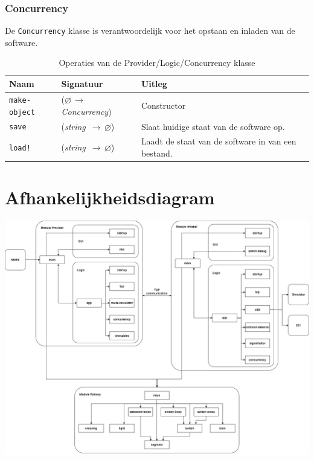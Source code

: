 \documentclass[a4paper, 11pt]{article}
\newcommand{\naar}{\,$\rightarrow$\,}
\renewcommand{\empty}{$\varnothing$}
\newcommand{\<}{\scriptsize\textless\normalsize}
\renewcommand{\>}{\scriptsize\textgreater\normalsize}
\begin{document}
\subsubsection{Concurrency} %
De \texttt{Concurrency} klasse is verantwoordelijk voor het opstaan en inladen van de software.
\begin{table}[H]
	\begin{center}
		\begin{tabular}{|l l l|}
			\hline
			\textbf{Naam} & \textbf{Signatuur} & \textbf{Uitleg}\\
			\hline
			\texttt{make-object} & (\empty \naar \textit{Concurrency}) & Constructor\\
			\hline
			\texttt{save} & (\textit{string} \naar \empty) & Slaat huidige staat van de software op.\\
			\texttt{load!} & (\textit{string} \naar \empty) & Laadt de staat van de software in van een bestand.\\
			\hline
		\end{tabular}
		\caption{Operaties van de Provider/Logic/Concurrency klasse}
	\end{center}
\end{table}

\newpage

\section{Afhankelijkheidsdiagram} %
\begin{center}
	\includegraphics[scale=.33]{Afhankelijkheidsdiagrammen/2024-2025.jpg}
\end{center}
\end{document}
